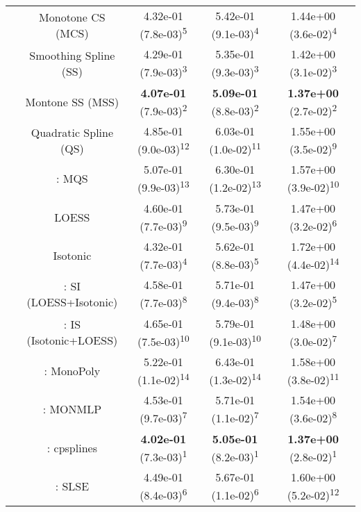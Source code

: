 \begin{tabular}{ccccc}
&Monotone CS (MCS)& 4.32e-01 (7.8e-03)\textsuperscript{5}& 5.42e-01 (9.1e-03)\textsuperscript{4}& 1.44e+00 (3.6e-02)\textsuperscript{4}\tabularnewline
&Smoothing Spline (SS)& 4.29e-01 (7.9e-03)\textsuperscript{3}& 5.35e-01 (9.3e-03)\textsuperscript{3}& 1.42e+00 (3.1e-02)\textsuperscript{3}\tabularnewline
&Montone SS (MSS)& \textbf{4.07e-01} (7.9e-03)\textsuperscript{2}& \textbf{5.09e-01} (8.8e-03)\textsuperscript{2}& \textbf{1.37e+00} (2.7e-02)\textsuperscript{2}\tabularnewline
&Quadratic Spline (QS)& 4.85e-01 (9.0e-03)\textsuperscript{12}& 6.03e-01 (1.0e-02)\textsuperscript{11}& 1.55e+00 (3.5e-02)\textsuperscript{9}\tabularnewline
&\textcite{heMonotoneBsplineSmoothing1998}: MQS& 5.07e-01 (9.9e-03)\textsuperscript{13}& 6.30e-01 (1.2e-02)\textsuperscript{13}& 1.57e+00 (3.9e-02)\textsuperscript{10}\tabularnewline
&LOESS& 4.60e-01 (7.7e-03)\textsuperscript{9}& 5.73e-01 (9.5e-03)\textsuperscript{9}& 1.47e+00 (3.2e-02)\textsuperscript{6}\tabularnewline
&Isotonic& 4.32e-01 (7.7e-03)\textsuperscript{4}& 5.62e-01 (8.8e-03)\textsuperscript{5}& 1.72e+00 (4.4e-02)\textsuperscript{14}\tabularnewline
&\textcite{mammenEstimatingSmoothMonotone1991}: SI (LOESS+Isotonic)& 4.58e-01 (7.7e-03)\textsuperscript{8}& 5.71e-01 (9.4e-03)\textsuperscript{8}& 1.47e+00 (3.2e-02)\textsuperscript{5}\tabularnewline
&\textcite{mammenEstimatingSmoothMonotone1991}: IS (Isotonic+LOESS)& 4.65e-01 (7.5e-03)\textsuperscript{10}& 5.79e-01 (9.1e-03)\textsuperscript{10}& 1.48e+00 (3.0e-02)\textsuperscript{7}\tabularnewline
&\textcite{murrayFastFlexibleMethods2016a}: MonoPoly& 5.22e-01 (1.1e-02)\textsuperscript{14}& 6.43e-01 (1.3e-02)\textsuperscript{14}& 1.58e+00 (3.8e-02)\textsuperscript{11}\tabularnewline
&\textcite{cannonMonmlpMultilayerPerceptron2017}: MONMLP& 4.53e-01 (9.7e-03)\textsuperscript{7}& 5.71e-01 (1.1e-02)\textsuperscript{7}& 1.54e+00 (3.6e-02)\textsuperscript{8}\tabularnewline
&\textcite{navarro-garciaConstrainedSmoothingOutofrange2023}: cpsplines& \textbf{4.02e-01} (7.3e-03)\textsuperscript{1}& \textbf{5.05e-01} (8.2e-03)\textsuperscript{1}& \textbf{1.37e+00} (2.8e-02)\textsuperscript{1}\tabularnewline
&\textcite{groeneboomConfidenceIntervalsMonotone2023}: SLSE& 4.49e-01 (8.4e-03)\textsuperscript{6}& 5.67e-01 (1.1e-02)\textsuperscript{6}& 1.60e+00 (5.2e-02)\textsuperscript{12}\tabularnewline
\bottomrule
\end{tabular}
